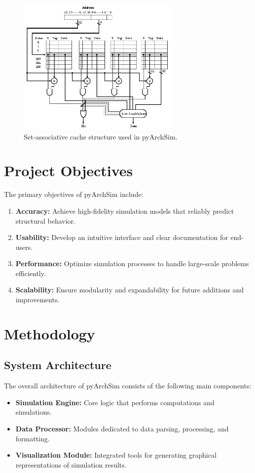 \documentclass[12pt,a4paper]{report}
\begin{document}
\begin{figure}[h!]
  \centering
  \includegraphics[width=0.7\textwidth]{figs/set_associative_cache.jpg}
  \caption{Set-associative cache structure used in pyArchSim.}
  \label{fig:set_associative_cache}
\end{figure}

\section{Project Objectives}
The primary objectives of pyArchSim include:
\begin{enumerate}
  \item \textbf{Accuracy:} Achieve high-fidelity simulation models that reliably predict structural behavior.
  \item \textbf{Usability:} Develop an intuitive interface and clear documentation for end-users.
  \item \textbf{Performance:} Optimize simulation processes to handle large-scale problems efficiently.
  \item \textbf{Scalability:} Ensure modularity and expandability for future additions and improvements.
\end{enumerate}

\section{Methodology}
\subsection{System Architecture}
The overall architecture of pyArchSim consists of the following main components:
\begin{itemize}
  \item \textbf{Simulation Engine:} Core logic that performs computations and simulations.
  \item \textbf{Data Processor:} Modules dedicated to data parsing, processing, and formatting.
  \item \textbf{Visualization Module:} Integrated tools for generating graphical representations of simulation results.
\end{itemize}
\end{document}
